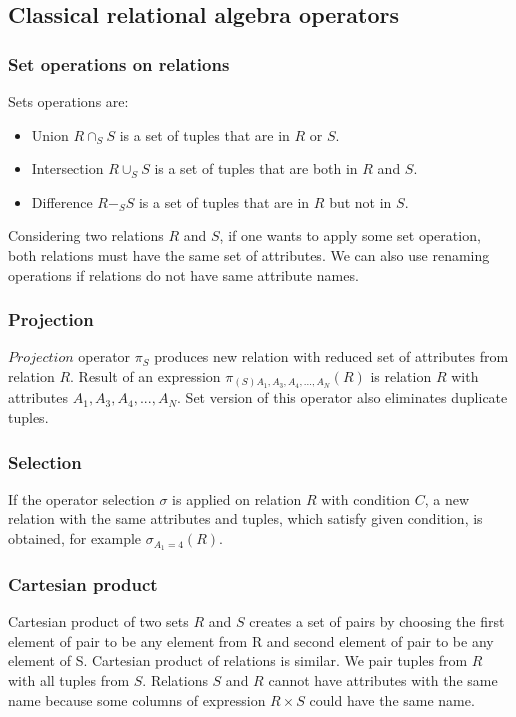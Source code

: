 \subsection{Classical relational algebra operators}
\subsubsection{Set operations on relations}

Sets operations are:
\begin{itemize}
\item Union $R\cap_S S$ is a set of tuples that are in $R$ or $S$.
\item Intersection $R\cup_S S$  is a set of tuples that are both in $R$ and $S$. 
\item Difference $R-_S S$ is a set of tuples that are in $R$ but not in $S$.

\end{itemize}

Considering two relations $R$ and $S$, if one wants to apply some set operation, both relations must have the same set of attributes. We can also use renaming operations if relations do not have same attribute names.

\subsubsection{Projection}
\label{projection}
$Projection$ operator $\pi_S$ produces new relation with reduced set of attributes from relation $R$. Result of an expression $\pi_{(S) A_1,A_3,A_4,...,A_N}(R)$ is relation $R$ with attributes $A_1,A_3,A_4,...,A_N$. Set version of this operator also eliminates duplicate tuples.

\subsubsection{Selection}
If the operator selection $\sigma$ is applied on relation $R$ with condition $C$, a new relation with the same attributes and tuples, which satisfy given condition, is obtained, for example $\sigma_{A_1=4}(R)$.

\subsubsection{Cartesian product}
Cartesian product of two sets $R$ and $S$ creates a set of pairs by choosing the first element of pair to be any element from R and second element of pair to be any element of S. Cartesian product of relations is similar. We pair tuples from $R$ with all tuples from $S$. Relations $S$ and $R$ cannot have attributes with the same name  because some columns of expression $R\times S$ could have the same name.

